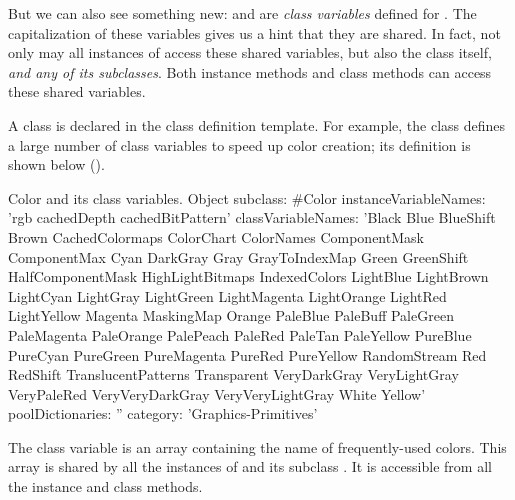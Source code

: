 \documentclass[a4paper,10pt,twoside]{book}
\begin{document}
But we can also see something new:  and  are \emph{class variables} defined for .
The capitalization of these variables gives us a hint that they are shared.
In fact, not only may all instances of  access these shared variables, but also the  class itself, \emph{and any of its subclasses}.
Both instance methods and class methods can access these shared variables.


A class  is declared in the class definition template.
For example, the class  defines a large number of class variables to speed up color creation; its definition is shown below ().
\newline %

\begin{classdef}[Color]{Color and its class variables.}
Object subclass: #Color
        instanceVariableNames: 'rgb cachedDepth cachedBitPattern'
        classVariableNames: 'Black Blue BlueShift Brown CachedColormaps ColorChart ColorNames ComponentMask ComponentMax Cyan DarkGray Gray GrayToIndexMap Green GreenShift HalfComponentMask HighLightBitmaps IndexedColors LightBlue LightBrown LightCyan LightGray LightGreen LightMagenta LightOrange LightRed LightYellow Magenta MaskingMap Orange PaleBlue PaleBuff PaleGreen PaleMagenta PaleOrange PalePeach PaleRed PaleTan PaleYellow PureBlue PureCyan PureGreen PureMagenta PureRed PureYellow RandomStream Red RedShift TranslucentPatterns Transparent VeryDarkGray VeryLightGray VeryPaleRed VeryVeryDarkGray VeryVeryLightGray White Yellow'
        poolDictionaries: ''
        category: 'Graphics-Primitives'
\end{classdef}

The class variable  is an array containing the name of frequently-used colors.
This array is shared by all the instances of  and its subclass .
It is accessible from all the instance and class methods. %
\end{document}
